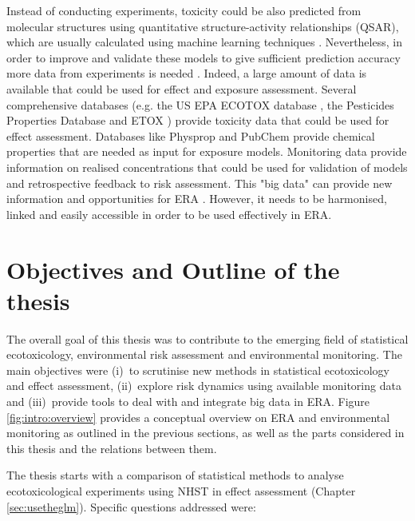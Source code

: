 Instead of conducting experiments, toxicity could be also predicted from molecular structures using quantitative structure-activity relationships (QSAR), which are usually calculated using machine learning techniques \citep{breiman_statistical_2001-1, murrell_chemically_2015, cortes-ciriano_bioalerts:_2016}. 
Nevertheless, in order to improve and validate these models to give sufficient prediction accuracy more data from experiments is needed \citep{kuhne_read-across_2013}. 
Indeed, a large amount of data is available that could be used for effect and exposure assessment. 
Several comprehensive databases (e.g. the US EPA ECOTOX database \citep{u.s._epa_ecotoxicology_2016}, the Pesticides Properties Database \citep{lewis_international_2016} and ETOX \citep{umweltbundesamt_etox:_2016}) provide toxicity data that could be used for effect assessment.
Databases like Physprop \citep{howard_physical_2016} and PubChem \citep{kim_pubchem_2016} provide chemical properties that are needed as input for exposure models.
Monitoring data provide information on realised concentrations that could be used for validation of models and retrospective feedback to risk assessment.
This "big data" can provide new information and opportunities for ERA \citep{dafforn_big_2015}. 
However, it needs to be harmonised, linked and easily accessible in order to be used effectively in ERA.



\section{Objectives and Outline of the thesis}

The overall goal of this thesis was to contribute to the emerging field of statistical ecotoxicology, environmental risk assessment and environmental monitoring.
The main objectives were (i)~to scrutinise new methods in statistical ecotoxicology and effect assessment,
(ii)~explore risk dynamics using available monitoring data and
(iii)~provide tools to deal with and integrate big data in ERA.
Figure \ref{fig:intro:overview} provides a conceptual overview on ERA and environmental monitoring as outlined in the previous sections, as well as the parts considered in this thesis and the relations between them. 

\noindent The thesis starts with a comparison of statistical methods to analyse ecotoxicological experiments using NHST in effect assessment (Chapter \ref{sec:usetheglm}). 
Specific questions addressed were:

